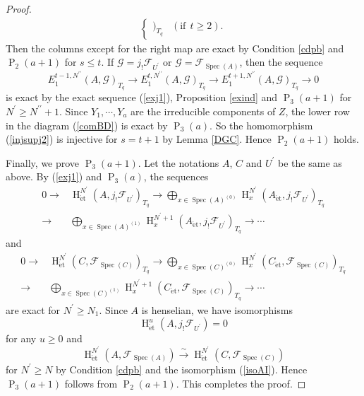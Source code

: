 \documentclass{article}
\newcommand{\spec}{\operatorname{Spec}}
\newcommand{\et}{\mathrm{\acute{e}t}}
\newcommand{\HO}{\operatorname{H}}
\begin{document}
\begin{proof}
\begin{align*}
\begin{cases}
)_{T_{q}}
& (\textrm{if}~~t\geq 2).
\end{cases}
%
%
\end{align*}
%
Then the columns except for the right map are exact by
Condition \ref{cdpb} 
and $\operatorname{P}_{2}(a+1)$ for $s\leq t$.
If $\mathcal{G}=j_{!}\mathcal{F}_{U^{\prime}}$ or $\mathcal{G}=\mathcal{F}_{\spec(A)}$, 
then the sequence
%
\begin{equation*}
E_{1}^{t-1, N^{\prime\prime}}(A, 
\mathcal{G}
)_{T_{q}}
\to
E_{1}^{t, N^{\prime\prime}}(A, 
\mathcal{G}
)_{T_{q}}
\to
E_{1}^{t+1, N^{\prime\prime}}(A, 
\mathcal{G}
)_{T_{q}}
\to
0
\end{equation*}
%
is exact by 
the exact sequence (\ref{exj1}),
Proposition \ref{exind}
and
$\operatorname{P}_{3}(a+1)$
for
$N^{\prime}\geq N^{\prime\prime}+1$.
Since $Y_{1}, \cdots, Y_{a}$ are the irreducible components of $Z$, 
the lower row in the diagram (\ref{comBD}) is exact by $\operatorname{P}_{3}(a)$.
So the homomorphism (\ref{injsupj2}) is injective for $s=t+1$ by Lemma \ref{DGC}.
Hence $\operatorname{P}_{2}(a+1)$ holds.

Finally, we prove $\operatorname{P}_{3}(a+1)$.
Let the notations $A$, $C$ and $U^{\prime}$ be the same as above.
By (\ref{exj1}) and $\operatorname{P}_{3}(a)$, the sequences
%
\begin{align*}
0\to 
&
\HO_{\et}^{N^{\prime}}(A, j_{!}\mathcal{F}_{U^{\prime}})_{T_{q}}
\to
\bigoplus_{x\in\spec(A)^{(0)}}
\HO^{N^{\prime}}_{x}(
A_{\et},
j_{!}\mathcal{F}_{U^{\prime}}
)_{T_{q}}   
\\
\to
&
\bigoplus_{x\in\spec(A)^{(1)}}
\HO^{N^{\prime}+1}_{x}(
A_{\et}, 
j_{!}\mathcal{F}_{U^{\prime}})_{T_{q}}
\to\cdots  
\end{align*}
%
and
%
\begin{align*}
0\to 
&
\HO_{\et}^{N^{\prime}}(C, 
\mathcal{F}_{\spec(C)})_{T_{q}}
\to
\bigoplus_{x\in\spec(C)^{(0)}}
\HO^{N^{\prime}}_{x}(
C_{\et},
\mathcal{F}_{\spec(C)}
)_{T_{q}}   
\\
\to
&
\bigoplus_{x\in\spec(C)^{(1)}}
\HO^{N^{\prime}+1}_{x}(
C_{\et}, 
\mathcal{F}_{\spec(C)})_{T_{q}}
\to\cdots
\end{align*}
%
are exact for $N^{\prime}\geq N_{1}$.
Since $A$ is henselian, we have isomorphisms
%
\begin{equation*}
\HO^{u}_{\et}(
A,
j_{!}\mathcal{F}_{U^{\prime}}
)    
=0
\end{equation*}
%
for any $u\geq 0$ and
%
\begin{equation*}
\HO^{N^{\prime}}_{\et}(A,
\mathcal{F}_{\spec(A)})
\xrightarrow{\sim}
\HO^{N^{\prime}}_{\et}(C,
\mathcal{F}_{\spec(C)}
)
\end{equation*}
%
for $N^{\prime}\geq N$
by Condition \ref{cdpb} and the isomorphism (\ref{isoAI}).
Hence $\operatorname{P}_{3}(a+1)$ follows from
$\operatorname{P}_{2}(a+1)$. This completes the proof.
\end{proof}
%
\end{document}
